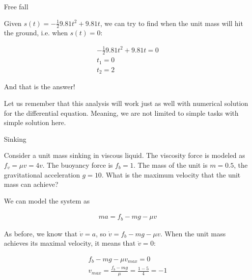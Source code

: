 \documentclass{beamer}
\begin{document}
\begin{frame}{Free fall}
	\begin{flushleft}
		
		Given $s(t) = -\frac{1}{2} 9.81 t^2 +  9.81t $, we can try to find when the unit mass will hit the ground, i.e. when $s(t) = 0$:
		
		\begin{align}
	-\frac{1}{2} 9.81 t^2 +  9.81t = 0 \\
	t_1 = 0\\
	t_2 = 2
		\end{align}					
	
	And that is the answer!
	
	\bigskip
	
	Let us remember that this analysis will work just as well with numerical solution for the differential equation. Meaning, we are not limited to simple tasks with simple solution here.
		
	\end{flushleft}
\end{frame}



\begin{frame}{Sinking}
	\begin{flushleft}
		
		Consider a unit mass sinking in viscous liquid. The viscosity force is modeled as $f_v = \mu v = 4 v$. The buoyancy force is $f_b = 1$. The mass of the unit is $m = 0.5$, the gravitational acceleration $g = 10$. What is the maximum velocity that the unit mass can achieve?
		
		\bigskip
		
		We can model the system as
		
		\begin{align}
			m a = f_b - mg - \mu v
		\end{align}			
	
			As before, we know that $\dot v = a$, so $\dot v =  f_b - mg - \mu v$. When the unit mass achieves its maximal velocity, it means that $\dot v = 0$:
			
		\begin{align}
			f_b - mg - \mu v_{max} = 0 \\
			v_{max} = \frac{f_b - mg}{\mu} =  \frac{1 - 5}{4} = -1
		\end{align}				
		
	\end{flushleft}
\end{frame}
\end{document}

